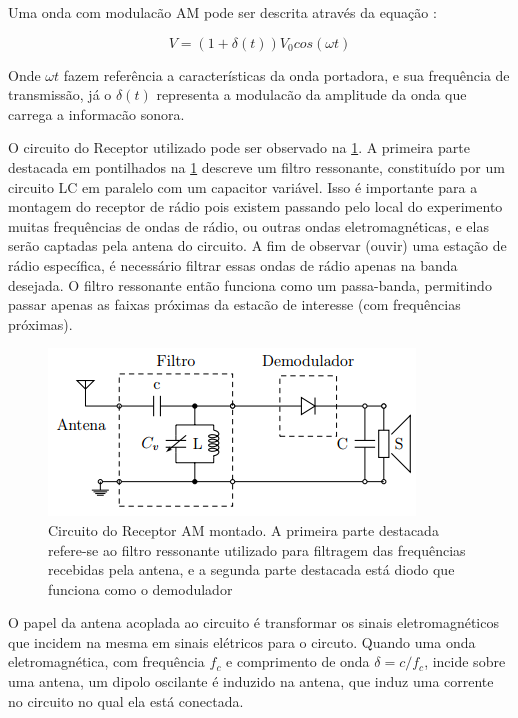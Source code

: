 \documentclass[11pt,a4paper]{article}
\begin{document}
    Uma onda com modulacão AM \cite{livro2} pode ser descrita através da equação :
    
    \begin{equation}
        V = (1+ \delta (t))V_0cos(\omega t)
        \label{eqOndaAM}
    \end{equation}
    
    Onde $\omega t$ fazem referência a características da onda portadora, e sua frequência de transmissão, já o $\delta (t)$ representa a modulacão da amplitude da onda que carrega a informacão sonora.
    
    O circuito do Receptor utilizado pode ser observado na \cref{Receptor}. A primeira parte destacada em pontilhados na \cref{Receptor} descreve um filtro ressonante, constituído por um circuito LC em paralelo com um capacitor variável. Isso é importante para a montagem do receptor de rádio pois existem passando pelo local do experimento muitas frequências de ondas de rádio, ou outras ondas eletromagnéticas, e elas serão captadas pela antena do circuito. A fim de observar (ouvir) uma estação de rádio específica, é necessário filtrar essas ondas de rádio apenas na banda desejada.
    O filtro ressonante então funciona como um passa-banda, permitindo passar apenas as faixas próximas da estacão de interesse (com frequências próximas).
    
        \begin{figure}[!htb]
        \centering
        \includegraphics[scale=0.7]{Receptor.png}
        \caption{Circuito do Receptor AM montado. A primeira parte destacada refere-se ao filtro ressonante utilizado para filtragem das frequências recebidas pela antena, e a segunda parte destacada está diodo que funciona como o demodulador}
        \label{Receptor}
        \end{figure}
    
    O papel da antena acoplada ao circuito é transformar os sinais eletromagnéticos que incidem na mesma em sinais elétricos para o circuto. Quando uma onda eletromagnética, com frequência $f_c$ e comprimento
    de onda $\delta = c/f_c$, incide sobre uma antena, um dipolo oscilante é induzido na antena, que
    induz uma corrente no circuito no qual ela está conectada.
    
\end{document}
